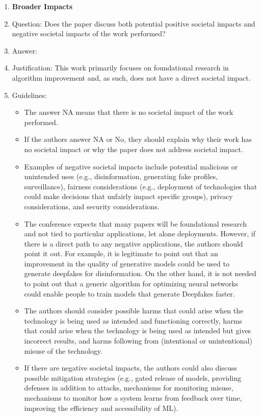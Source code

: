 \documentclass{article}
\begin{document}
\begin{enumerate}
\item {\bf Broader Impacts}
    \item[] Question: Does the paper discuss both potential positive societal impacts and negative societal impacts of the work performed?
    \item[] Answer: \answerNA{} %
    \item[] Justification: This work primarily focuses on foundational research in algorithm improvement and, as such, does not have a direct societal impact.
    \item[] Guidelines:
    \begin{itemize}
        \item The answer NA means that there is no societal impact of the work performed.
        \item If the authors answer NA or No, they should explain why their work has no societal impact or why the paper does not address societal impact.
        \item Examples of negative societal impacts include potential malicious or unintended uses (e.g., disinformation, generating fake profiles, surveillance), fairness considerations (e.g., deployment of technologies that could make decisions that unfairly impact specific groups), privacy considerations, and security considerations.
        \item The conference expects that many papers will be foundational research and not tied to particular applications, let alone deployments. However, if there is a direct path to any negative applications, the authors should point it out. For example, it is legitimate to point out that an improvement in the quality of generative models could be used to generate deepfakes for disinformation. On the other hand, it is not needed to point out that a generic algorithm for optimizing neural networks could enable people to train models that generate Deepfakes faster.
        \item The authors should consider possible harms that could arise when the technology is being used as intended and functioning correctly, harms that could arise when the technology is being used as intended but gives incorrect results, and harms following from (intentional or unintentional) misuse of the technology.
        \item If there are negative societal impacts, the authors could also discuss possible mitigation strategies (e.g., gated release of models, providing defenses in addition to attacks, mechanisms for monitoring misuse, mechanisms to monitor how a system learns from feedback over time, improving the efficiency and accessibility of ML).
    \end{itemize}
    

\end{enumerate}
\end{document}
